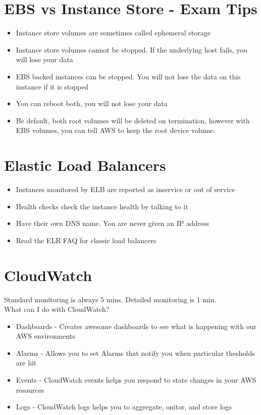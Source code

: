 \documentclass{article}
\begin{document}
\section{EBS vs Instance Store - Exam Tips}
\begin{itemize}
\item
Instance store volumes are sometimes called ephemeral storage

\item
Instance store volumes cannot be stopped. If the underlying host fails, you will lose your data

\item
EBS backed instances can be stopped. You will not lose the data on this instance if it is stopped

\item
You can reboot both, you will not lose your data

\item
Be default, both root volumes will be deleted on termination, however with EBS volumes, you can tell AWS to keep the root device volume.
\end{itemize}

\section{Elastic Load Balancers}
\begin{itemize}
\item
Instances monitored by ELB are reported as inservice or out of service

\item
Health checks check the instance health by talking to it

\item
Have their own DNS name. You are never given an IP address

\item
Read the ELB FAQ for classic load balancers
\end{itemize}

\section{CloudWatch}
Standard monitoring is always 5 mins. Detailed monitoring is 1 min. \\

What can I do with CloudWatch?
\begin{itemize}
\item
Dashboards - Creates awesome dashboards to see what is happening with our AWS environments

\item
Alarms - Allows you to set Alarms that notify you when particular thesholds are hit

\item
Events - CloudWatch events helps you respond to state changes in your AWS resources

\item
Logs - CloudWatch logs helps you to aggregate, onitor, and store logs
\end{itemize}
\end{document}
